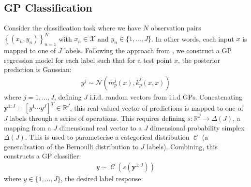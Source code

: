 \documentclass{article}
\newcommand{\Cat}{\operatorname{\mathcal{C}}}
\numberwithin{equation}{section}
\begin{document}
\subsection{GP Classification}
Consider the classification task where we have $N$ observation pairs $\left\{(x_n, y_n)\right\}_{n=1}^{N}$ with $x_n \in \mathcal{X}$ and $y_n \in \{1, \dots, J\}$. In other words, each input $x$ is mapped to one of $J$ labels. Following the approach from \cite{matthews2017scalable}, we construct a GP regression model for each label such that for a test point $x$, the posterior prediction is Gaussian:
\begin{align}
    y^j \sim \mathcal{N}\left(\bar{m}_p^j(x), \bar{k}_p^j(x, x)\right)
    \label{gp-classifier-regressors}
\end{align}
where $j=1, \dots, J$, defining $J$ i.i.d. random vectors from i.i.d GPs.
Concatenating $\mathbf{y}^{1:J} = [y^1 \cdots y^J]^T \in \mathbb{R}^{J}$, this real-valued vector of predictions is mapped to one of $J$ labels through a series of operations. This requires defining $s: \mathbb{R}^J \rightarrow \Delta(J)$, a mapping from a $J$ dimensional real vector to a $J$ dimensional probability simplex $\Delta(J)$. This is used to parameterise a categorical distribution $\Cat$ (a generalisation of the Bernoulli distribution to $J$ labels). Combining, this constructs a GP classifier:
\begin{align}
y \sim \Cat \left(s\left(\mathbf{y}^{1:J}\right)\right)
\label{gp-classifier}
\end{align}
where $y \in \{1, \dots, J\}$, the desired label response.
\end{document}
